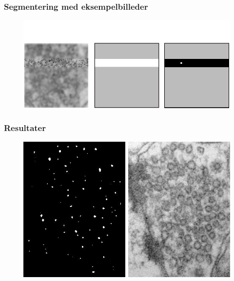 \documentclass[12pt,t]{beamer}
\begin{document}
\begin{frame}
\frametitle{Segmentering med eksempelbilleder}
\begin{figure}[H]
\includegraphics[scale=0.35]{img/afstand/16.png}
\end{figure}
\end{frame}




\begin{frame}
\frametitle{Resultater}
\begin{figure}[H]
	\centering
	\includegraphics[scale=0.4]{img/finalmethod/thres_plot_before.png}
\end{figure}
\end{frame}
\end{document}
